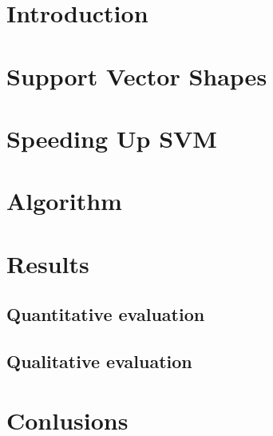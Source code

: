 \documentclass[12pt]{article}
\begin{document}
\maketitle

\section{Introduction}

\section{Support Vector Shapes}


\section{Speeding Up SVM}

\section{Algorithm}

\section{Results}
\subsection{Quantitative evaluation}
\subsection{Qualitative evaluation}
\section{Conlusions}



\end{document}
